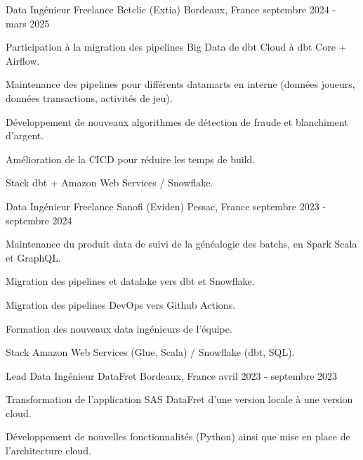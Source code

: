 
\begin{cventries}
	\cventry
	{Data Ingénieur Freelance}
	{Betclic (Extia) }
	{Bordeaux, France}
	{septembre 2024 - mars 2025}
	{
		\begin{cvitems}
			\item {Participation à la migration des pipelines Big Data de dbt Cloud à dbt Core + Airflow.}
			\item {Maintenance des pipelines pour différents datamarts en interne (données joueurs, données transactions, activités de jeu).}
			\item {Développement de nouveaux algorithmes de détection de fraude et blanchiment d'argent.}
			\item {Amélioration de la CICD pour réduire les temps de build.}
			\item {Stack dbt + Amazon Web Services / Snowflake.}
		\end{cvitems}
	}

	\cventry
	{Data Ingénieur Freelance}
	{Sanofi (Eviden)}
	{Pessac, France}
	{septembre 2023 - septembre 2024}
	{
		\begin{cvitems}
			\item {Maintenance du produit data de suivi de la généalogie des batchs, en Spark Scala et GraphQL.}
			\item {Migration des pipelines et datalake vers dbt et Snowflake.}
			\item {Migration des pipelines DevOps vers Github Actions.}
			\item {Formation des nouveaux data ingénieurs de l’équipe.}
			\item {Stack Amazon Web Services (Glue, Scala) / Snowflake (dbt, SQL).}
		\end{cvitems}
	}
	
	\cventry
	{Lead Data Ingénieur}
	{DataFret}
	{Bordeaux, France}
	{avril 2023 - septembre 2023}
	{
		\begin{cvitems}
			\item {Transformation de l'application SAS DataFret d'une version locale à une version cloud.}
			\item {Développement de nouvelles fonctionnalités (Python) ainsi que mise en place de l'architecture cloud.}
		\end{cvitems}
	}
	

\end{cventries}
